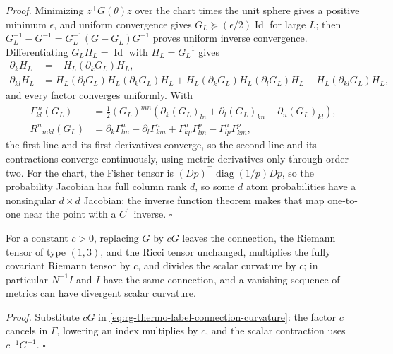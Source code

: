 \noindent\emph{Proof.}
Minimizing $z^\top G(\theta)z$ over the chart times the unit sphere gives a
positive minimum $\epsilon$, and uniform convergence gives
$G_L\succeq(\epsilon/2)\operatorname{Id}$ for large $L$; then
$G_L^{-1}-G^{-1}=G_L^{-1}(G-G_L)G^{-1}$ proves uniform inverse convergence.
Differentiating $G_LH_L=\operatorname{Id}$ with $H_L=G_L^{-1}$ gives
\begin{align}
 \partial_kH_L&=-H_L(\partial_kG_L)H_L,\\
 \partial_{kl}H_L
 &=H_L(\partial_lG_L)H_L(\partial_kG_L)H_L
  +H_L(\partial_kG_L)H_L(\partial_lG_L)H_L
  -H_L(\partial_{kl}G_L)H_L,
 \label{eq:rg-thermo-label-inverse-derivatives}
\end{align}
and every factor converges uniformly. With
\begin{align}
 \Gamma^m_{kl}(G_L)
 &=\frac12(G_L)^{mn}
   (\partial_k(G_L)_{ln}+\partial_l(G_L)_{kn}-\partial_n(G_L)_{kl}),\\
 R^n{}_{mkl}(G_L)
 &=\partial_k\Gamma^n_{lm}-\partial_l\Gamma^n_{km}
    +\Gamma^n_{kp}\Gamma^p_{lm}
    -\Gamma^n_{lp}\Gamma^p_{km},
 \label{eq:rg-thermo-label-connection-curvature}
\end{align}
the first line and its first derivatives converge, so the second line and its
contractions converge continuously, using metric derivatives only through
order two. For the chart, the Fisher tensor is
$(Dp)^\top\operatorname{diag}(1/p)Dp$, so the probability Jacobian has full
column rank $d$, so some $d$ atom probabilities have a nonsingular $d\times d$
Jacobian; the
inverse function theorem \citep[Thm.~9.24]{Rudin1976} makes that map
one-to-one near the point with a $C^1$ inverse. $\square$

For a constant $c>0$, replacing $G$ by $cG$ leaves the connection, the
Riemann tensor of type $(1,3)$, and the Ricci tensor unchanged, multiplies the
fully covariant Riemann tensor by $c$, and divides the scalar curvature by
$c$; in particular $N^{-1}I$ and $I$ have the same connection, and a
vanishing sequence of metrics can have divergent scalar curvature.

\noindent\emph{Proof.}
Substitute $cG$ in \cref{eq:rg-thermo-label-connection-curvature}: the factor
$c$ cancels in $\Gamma$, lowering an index multiplies by $c$, and the scalar
contraction uses $c^{-1}G^{-1}$. $\square$

